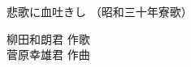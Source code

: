 \documentclass[10pt,b5j]{tarticle} %
\begin{document}
\begin{minipage}[c]{0.7\hsize} %
    \begin{center}
        {\LARGE
            悲歌に血吐きし %
        }
        {\small 
            （昭和三十年寮歌） %
        }
    \end{center}
\end{minipage}
\begin{minipage}[c]{0.3\hsize} %
    \begin{flushright} %
        柳田和朗君 作歌\\菅原幸雄君 作曲 %
    \end{flushright}
\end{minipage}
\end{document}
